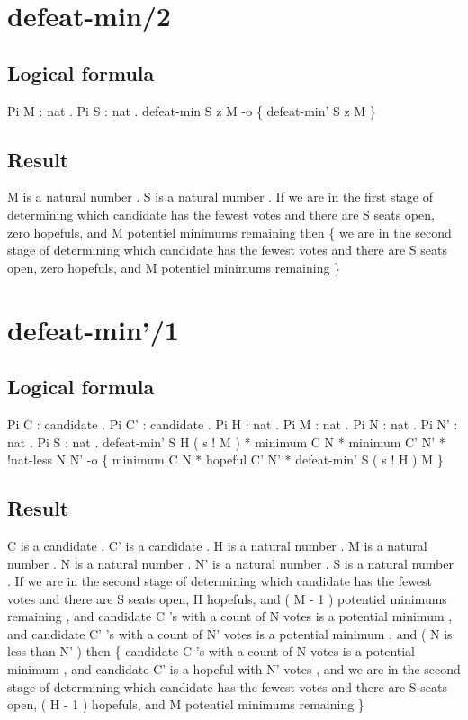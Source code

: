 \section{defeat-min/2}
\subsection{Logical formula}
\begin{texto2}
	Pi M : nat . Pi S : nat . defeat-min S z M -o \{ defeat-min' S z M \}
\end{texto2}

\subsection{Result}
\begin{texto2}
	M is a natural number . S is a natural number . If we are in the first stage of determining which candidate has the fewest votes and there are S seats open, zero hopefuls, and M potentiel minimums remaining then \{ we are in the second stage of determining which candidate has the fewest votes and there are S seats open, zero hopefuls, and M potentiel minimums remaining \}
\end{texto2}

\section{defeat-min'/1}
\subsection{Logical formula}
\begin{texto2}
	Pi C : candidate . Pi C' : candidate . Pi H : nat . Pi M : nat . Pi N : nat . Pi N' : nat . Pi S : nat . defeat-min' S H ( s ! M ) * minimum C N * minimum C' N' * !nat-less N N' -o \{ minimum C N * hopeful C' N' * defeat-min' S ( s ! H ) M \}
\end{texto2}

\subsection{Result}
\begin{texto2}
	C is a candidate . C' is a candidate . H is a natural number . M is a natural number . N is a natural number . N' is a natural number . S is a natural number . If we are in the second stage of determining which candidate has the fewest votes and there are S seats open, H hopefuls, and ( M - 1 ) potentiel minimums remaining , and candidate C 's with a count of N votes is a potential minimum , and candidate C' 's with a count of N' votes is a potential minimum , and ( N is less than N' ) then \{ candidate C 's with a count of N votes is a potential minimum , and candidate C' is a hopeful with N' votes , and we are in the second stage of determining which candidate has the fewest votes and there are S seats open, ( H - 1 ) hopefuls, and M potentiel minimums remaining \}
\end{texto2}

